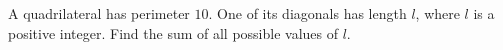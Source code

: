 A quadrilateral has perimeter $10$. One of its diagonals has length $l$, where $l$ is a positive integer. Find the sum of all possible values of $l$.
